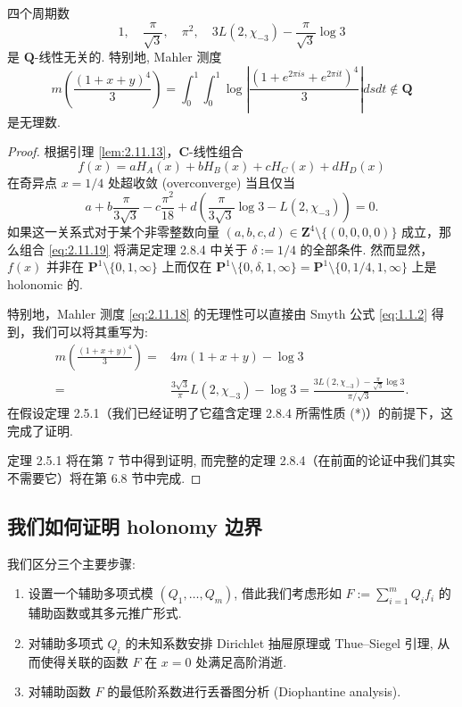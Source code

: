 \begin{theorem}\label{thm:2.11.17}
四个周期数
\[ 1, \quad \frac{\pi}{\sqrt{3}}, \quad \pi^2, \quad 3L(2,\chi_{-3}) - \frac{\pi}{\sqrt{3}}\log 3 \]
是 \(\mathbf{Q}\)-线性无关的.
特别地, Mahler 测度
\begin{equation}\label{eq:2.11.18}
  m\left(\frac{(1+x+y)^4}{3}\right) = \int_0^1 \int_0^1 \log\left\lvert\frac{(1+e^{2\pi i s} + e^{2\pi i t})^4}{3}\right\rvert ds dt \notin \mathbf{Q}
\end{equation}
是无理数.
\end{theorem}

\begin{proof}
根据引理 \ref{lem:2.11.13}，$\mathbf{C}$-线性组合
\begin{equation}\label{eq:2.11.19}
  f(x) = aH_A(x) + bH_B(x) + cH_C(x) + dH_D(x)
\end{equation}
在奇异点 $x = 1/4$ 处超收敛 (overconverge) 当且仅当
\[ a + b\frac{\pi}{3\sqrt{3}} - c\frac{\pi^2}{18} + d\left(\frac{\pi}{3\sqrt{3}}\log 3 - L(2,\chi_{-3})\right) = 0. \]
如果这一关系式对于某个非零整数向量 $(a, b, c, d) \in \mathbf{Z}^4 \setminus \{(0, 0, 0, 0)\}$ 成立，那么组合 \eqref{eq:2.11.19} 将满足定理 2.8.4 中关于 $\delta := 1/4$ 的全部条件. 然而显然，$f(x)$ 并非在 $\mathbf{P}^1 \setminus \{0, 1, \infty\}$ 上而仅在 $\mathbf{P}^1 \setminus \{0, \delta, 1, \infty\} = \mathbf{P}^1 \setminus \{0, 1/4, 1, \infty\}$ 上是 holonomic 的.

特别地，Mahler 测度 \eqref{eq:2.11.18} 的无理性可以直接由 Smyth 公式 \eqref{eq:1.1.2} 得到，我们可以将其重写为:
\[
\begin{aligned}
m\left(\frac{(1+x+y)^4}{3}\right) = {} & 4m(1+x+y) - \log 3 \\
= {} & \frac{3\sqrt{3}}{\pi}L(2,\chi_{-3}) - \log 3 = \frac{3L(2,\chi_{-3}) - \frac{\pi}{\sqrt{3}}\log 3}{\pi/\sqrt{3}}.
\end{aligned}
\]
在假设定理 2.5.1（我们已经证明了它蕴含定理 2.8.4 所需性质 (*)）的前提下，这完成了证明.

定理 2.5.1 将在第 7 节中得到证明, 而完整的定理 2.8.4（在前面的论证中我们其实不需要它）将在第 6.8 节中完成.
\end{proof}

\subsection{我们如何证明 holonomy 边界}\label{sec:2.12}

我们区分三个主要步骤:
\begin{enumerate}
  \item[(i)] 设置一个辅助多项式模 \((Q_1, \dots, Q_m)\), 借此我们考虑形如 \(F := \sum_{i=1}^m Q_i f_i\) 的辅助函数或其多元推广形式.
  \item[(ii)] 对辅助多项式 \(Q_i\) 的未知系数安排 Dirichlet 抽屉原理或 Thue--Siegel 引理, 从而使得关联的函数 $F$ 在 $x=0$ 处满足高阶消逝.
  \item[(iii)] 对辅助函数 $F$ 的最低阶系数进行丢番图分析 (Diophantine analysis).
\end{enumerate}

